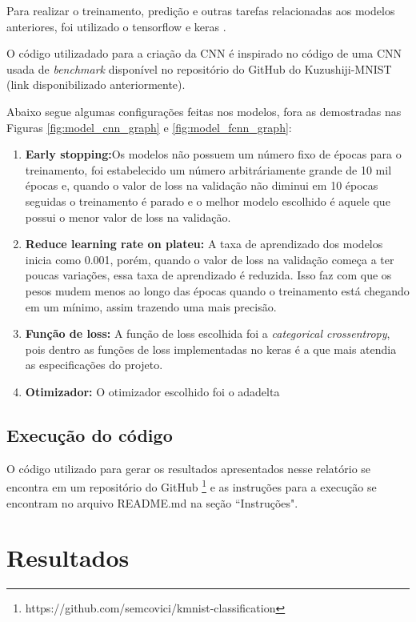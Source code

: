\documentclass[12pt]{article}
\begin{document}
Para realizar o treinamento, predição e outras tarefas relacionadas aos modelos anteriores, foi utilizado o tensorflow \cite{tensorflow2015-whitepaper} e keras \cite{chollet2015keras}.

O código utilizadado para a criação da CNN é inspirado no código de uma CNN usada de \textit{benchmark} disponível no repositório do GitHub do Kuzushiji-MNIST (link disponibilizado anteriormente).

Abaixo segue algumas configurações feitas nos modelos, fora as demostradas nas Figuras \ref{fig:model_cnn_graph} e \ref{fig:model_fcnn_graph}:

\begin{enumerate}
  \item \textbf{Early stopping:}Os modelos não possuem um número fixo de épocas para o treinamento, foi estabelecido um número arbitráriamente grande de 10 mil épocas e, quando o valor de loss na validação não diminui em 10 épocas seguidas o treinamento é parado e o melhor modelo escolhido é aquele que possui o menor valor de loss na validação. 
  \item \textbf{Reduce learning rate on plateu:} A taxa de aprendizado dos modelos inicia como 0.001, porém, quando o valor de loss na validação começa a ter poucas variações, essa taxa de aprendizado é reduzida. Isso faz com que os pesos mudem menos ao longo das épocas quando o treinamento está chegando em um mínimo, assim trazendo uma mais precisão. 
  \item \textbf{Função de loss:} A função de loss escolhida foi a \textit{categorical crossentropy}, pois dentro as funções de loss implementadas no keras é a que mais atendia as especificações do projeto.
  \item \textbf{Otimizador:} O otimizador escolhido foi o adadelta
\end{enumerate}


\subsection{Execução do código}

O código utilizado para gerar os resultados apresentados nesse relatório se encontra em um repositório do GitHub \footnote{https://github.com/semcovici/kmnist-classification} e as instruções para a execução se encontram no arquivo README.md na seção ``Instruções".


\section{Resultados}
\end{document}

